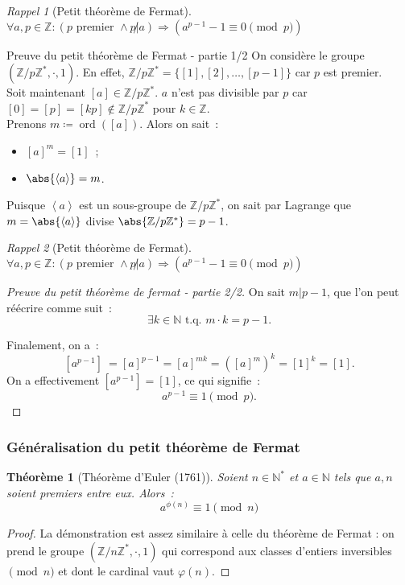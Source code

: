 \documentclass[10pt, mathserif]{beamer}
\DeclareMathOperator{\ord}{ord}
\newcommand{\tq}{\text{ t.q. }}
\newcommand{\Z}{\mathbb Z}
\newcommand{\N}{\mathbb N}
\newcommand{\eng}[1]{\left\langle#1\right\rangle}
\newtheorem{thm}{Théorème}[section]
\theoremstyle{definition}
\theoremstyle{remark}
\newtheorem*{rap}{Rappel}
\begin{document}
	\begin{frame}
		\begin{rap}[Petit théorème de Fermat]
			$\forall a, p \in \Z : (p \text{ premier } \land p \not | a) \Rightarrow \left(a^{p-1} -1 \equiv 0 \pmod p\right)$
		\end{rap}

		\begin{block}{Preuve du petit théorème de Fermat - partie 1/2}
			On considère le groupe $\left(\Z/p\Z^*, \cdot, 1\right)$. En effet, $\Z/p\Z^* = \{[1], [2], \dotsc, [p-1]\}$ car $p$ est premier. \\
			Soit maintenant $[a] \in \Z/p\Z^*$. $a$ n'est pas divisible par $p$ car $[0] = [p] = [kp] \not \in \Z/p\Z^*$ pour $k \in \Z$. \\
			Prenons $m \coloneqq \ord([a])$. Alors on sait~:
			\begin{itemize}
				\item $[a]^m = [1]$~;
				\item $\abs{\eng a} = m$.
			\end{itemize}

			Puisque $\eng a$ est un sous-groupe de $\Z/p\Z^*$, on sait par Lagrange que $m = \abs{\eng a}$ divise $\abs{\Z/p\Z^*} = p-1$.
		\end{block}
	\end{frame}

	\begin{frame}
		\begin{rap}[Petit théorème de Fermat]
			$\forall a, p \in \Z : (p \text{ premier } \land p \not | a) \Rightarrow \left(a^{p-1} -1 \equiv 0 \pmod p\right)$
		\end{rap}

		\begin{proof}[Preuve du petit théorème de fermat - partie 2/2]
			On sait $m | p-1$, que l'on peut réécrire comme suit~:
			\[\exists k \in \N \tq m \cdot k = p-1.\]

			Finalement, on a~:
			\[\left[a^{p-1}\right]\ = [a]^{p-1} = [a]^{mk} = \left([a]^m\right)^k = [1]^k = [1].\]
			On a effectivement $\left[a^{p-1}\right] = [1]$, ce qui signifie~:
			\[a^{p-1} \equiv 1 \pmod p.\]
		\end{proof}
	\end{frame}

	\begin{frame}
		\frametitle{Généralisation du petit théorème de Fermat}

		\begin{thm}[Théorème d'Euler (1761)]
			Soient $n \in \N^*$ et $a \in \N$ tels que $a, n$ soient premiers entre eux. Alors~:
			\[a^{\phi(n)} \equiv 1 \pmod n\]
		\end{thm}

		\begin{proof}
			La démonstration est assez similaire à celle du théorème de Fermat : on prend le groupe $(\Z/n\Z^*, \cdot, 1)$ qui correspond aux classes
			d'entiers inversibles $\pmod n$ et dont le cardinal vaut $\varphi(n)$.
		\end{proof}
	\end{frame}
\end{document}

